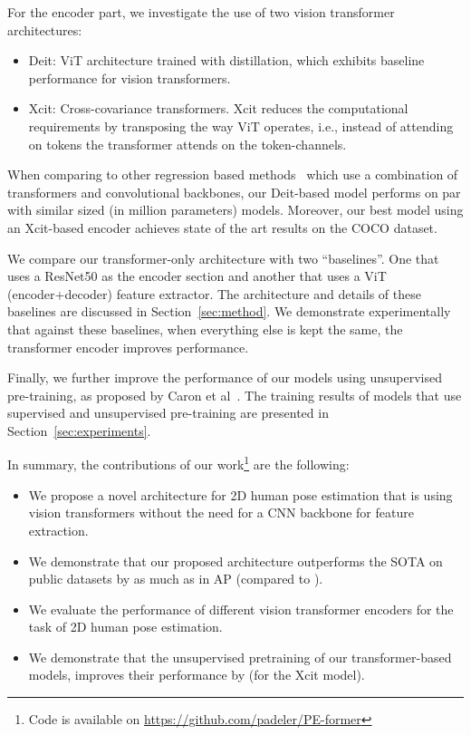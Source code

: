 \documentclass[runningheads]{llncs}
\begin{document}
For the encoder part, we investigate the use of two vision transformer architectures:
\begin{itemize}
  \item Deit\cite{touvron2021training}: ViT architecture trained with distillation, which exhibits 
  baseline performance for vision transformers.
  \item Xcit\cite{el2021xcit}: Cross-covariance transformers. Xcit reduces the computational requirements by transposing the way ViT operates, i.e., instead of attending on tokens the transformer attends on the token-channels.
\end{itemize}

When comparing to other regression based methods~\cite{li2021pose,mao2021tfpose} 
which use a combination of transformers and convolutional backbones,
our Deit-based model performs on par with similar sized (in million parameters) models.
Moreover, our best model using an Xcit-based encoder 
achieves state of the art results on the COCO dataset.

We compare our transformer-only architecture with two ``baselines''. One that uses
a ResNet50 as the encoder section and another that uses a ViT (encoder+decoder) feature extractor.
The architecture and details of these baselines are discussed in Section~\ref{sec:method}.
We demonstrate experimentally that against these baselines, when everything else is kept the same, the transformer encoder improves performance.

Finally, we further improve the performance of our models using unsupervised pre-training, as proposed 
by Caron et al~\cite{caron2021emerging}. The training results of models that use supervised and unsupervised pre-training are presented in Section~\ref{sec:experiments}. 

In summary, the contributions of our work\footnote{Code is available on \href{https://github.com/padeler/PE-former}{https://github.com/padeler/PE-former}} are the following:
\begin{itemize}
  \item We propose a novel architecture for 2D human pose estimation that is using vision transformers 
  without the need for a CNN backbone for feature extraction.
  \item We demonstrate that our proposed architecture outperforms the SOTA on public 
  datasets by as much as  in AP (compared to \cite{li2021pose}).
  \item We evaluate the performance of different vision transformer encoders for the 
  task of 2D human pose estimation.
  \item We demonstrate that the unsupervised pretraining of our transformer-based models, improves their performance by  (for the Xcit model).
\end{itemize}
\end{document}
